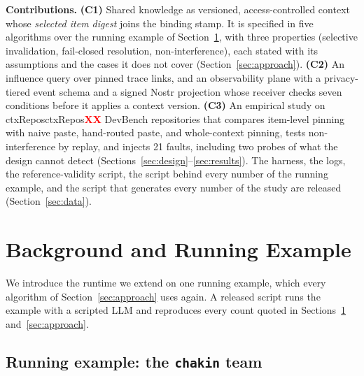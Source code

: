 \documentclass[10pt,conference]{IEEEtran}
\theoremstyle{definition}
\newcommand{\code}[1]{\texttt{#1}}
\newcommand{\R}[1]{\ifcsname #1\endcsname\csname #1\endcsname\else\textcolor{red}{\textbf{XX}}\fi}
\begin{document}
\smallskip\noindent\textbf{Contributions.}
\textbf{(C1)} Shared knowledge as versioned, access-controlled context whose \emph{selected item digest}
joins the binding stamp. It is specified in five algorithms over the running example of
Section~\ref{sec:background}, with three properties (selective invalidation, fail-closed resolution,
non-interference), each stated with its assumptions and the cases it does not cover
(Section~\ref{sec:approach}).
\textbf{(C2)} An influence query over pinned trace links, and an observability plane with a privacy-tiered
event schema and a signed Nostr projection whose receiver checks seven conditions before it applies a context
version.
\textbf{(C3)} An empirical study on \R{ctxRepos} DevBench repositories that compares item-level pinning with
naive paste, hand-routed paste, and whole-context pinning, tests non-interference by replay, and injects 21
faults, including two probes of what the design cannot detect (Sections~\ref{sec:design}--\ref{sec:results}).
The harness, the logs, the reference-validity script, the script behind every number of the running example,
and the script that generates every number of the study are released (Section~\ref{sec:data}).

\section{Background and Running Example}\label{sec:background}

We introduce the runtime we extend on one running example, which every algorithm of
Section~\ref{sec:approach} uses again. A released script runs the example with a scripted LLM and reproduces
every count quoted in Sections~\ref{sec:background} and~\ref{sec:approach}.

\subsection{Running example: the \code{chakin} team}\label{sec:running}
\end{document}
